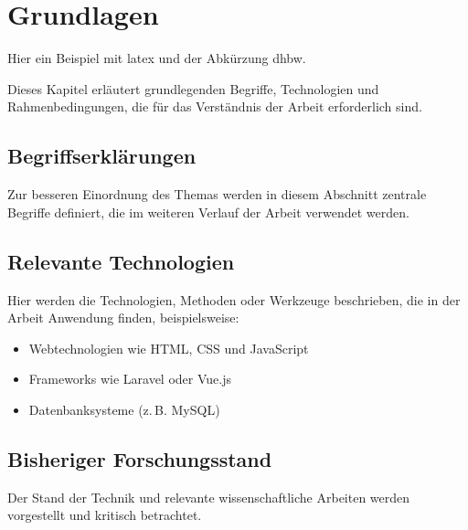\section{Grundlagen}


Hier ein Beispiel mit \gls{latex} und der Abkürzung \gls{dhbw}.

Dieses Kapitel erläutert grundlegenden Begriffe, Technologien und Rahmenbedingungen, die für das Verständnis der Arbeit erforderlich sind.

\subsection{Begriffserklärungen}
Zur besseren Einordnung des Themas werden in diesem Abschnitt zentrale Begriffe definiert, die im weiteren Verlauf der Arbeit verwendet werden.

\subsection{Relevante Technologien}
Hier werden die Technologien, Methoden oder Werkzeuge beschrieben, die in der Arbeit Anwendung finden, beispielsweise:

\begin{itemize}
    \item Webtechnologien wie HTML, CSS und JavaScript
    \item Frameworks wie Laravel oder Vue.js
    \item Datenbanksysteme (z.\,B. MySQL)
\end{itemize}

\subsection{Bisheriger Forschungsstand}
Der Stand der Technik und relevante wissenschaftliche Arbeiten werden vorgestellt und kritisch betrachtet.